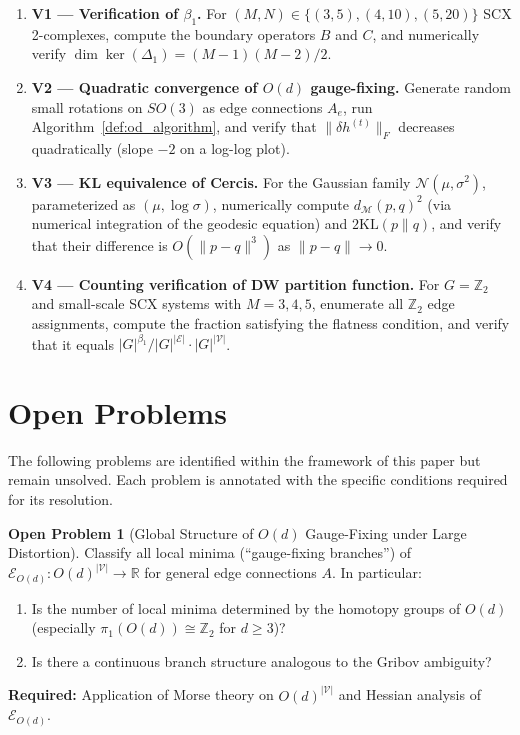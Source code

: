 \documentclass[12pt,a4paper]{article}
\theoremstyle{definition}
\newtheorem{problem}{Open Problem}[section]
\theoremstyle{remark}
\theoremstyle{definition}
\newcommand{\R}{\mathbb{R}}
\newcommand{\Z}{\mathbb{Z}}
\newcommand{\Od}{O(d)}
\newcommand{\SOthree}{SO(3)}
\newcommand{\verts}{\mathcal{V}}
\newcommand{\edgs}{\mathcal{E}}
\newcommand{\Lone}{\Delta_1}
\newcommand{\KL}{\mathrm{KL}}
\newcommand{\GeoDist}{d_{\mathcal{M}}}
\newcommand{\ZBetti}{\beta_1}
\begin{document}
\begin{enumerate}[label=V\arabic*:, leftmargin=*]
    \item \textbf{V1 — Verification of $\ZBetti$.}
    For $(M,N) \in \{(3,5), (4,10), (5,20)\}$ SCX 2-complexes,
    compute the boundary operators $B$ and $C$, and numerically verify $\dim \ker(\Lone) = (M-1)(M-2)/2$.

    \item \textbf{V2 — Quadratic convergence of $O(d)$ gauge-fixing.}
    Generate random small rotations on $\SOthree$ as edge connections $A_e$, run Algorithm~\ref{def:od_algorithm},
    and verify that $\|\delta h^{(t)}\|_F$ decreases quadratically (slope $-2$ on a log-log plot).

    \item \textbf{V3 — KL equivalence of Cercis.}
    For the Gaussian family $\mathcal{N}(\mu, \sigma^2)$, parameterized as $(\mu, \log \sigma)$,
    numerically compute $\GeoDist(p, q)^2$ (via numerical integration of the geodesic equation) and $2\KL(p\|q)$,
    and verify that their difference is $O(\|p-q\|^3)$ as $\|p-q\| \to 0$.

    \item \textbf{V4 — Counting verification of DW partition function.}
    For $G = \Z_2$ and small-scale SCX systems with $M=3,4,5$,
    enumerate all $\Z_2$ edge assignments, compute the fraction satisfying the flatness condition,
    and verify that it equals $|G|^{\ZBetti} / |G|^{|\edgs|} \cdot |G|^{|\verts|}$.
\end{enumerate}

\newpage

\section{Open Problems}
\label{sec:open}

The following problems are identified within the framework of this paper but remain unsolved. Each problem is annotated with the specific conditions required for its resolution.

\begin{problem}[Global Structure of $O(d)$ Gauge-Fixing under Large Distortion]\label{prob:moduli_space}
Classify all local minima (``gauge-fixing branches'') of $\mathcal{E}_{\Od}: \Od^{|\verts|} \to \R$ for general edge connections $A$.
In particular:
\begin{enumerate}[label=(\alph*)]
    \item Is the number of local minima determined by the homotopy groups of $\Od$ (especially $\pi_1(\Od) \cong \Z_2$ for $d \geq 3$)?
    \item Is there a continuous branch structure analogous to the Gribov ambiguity?
\end{enumerate}
\textbf{Required:} Application of Morse theory on $\Od^{|\verts|}$ and Hessian analysis of $\mathcal{E}_{\Od}$.
\end{problem}
\end{document}
